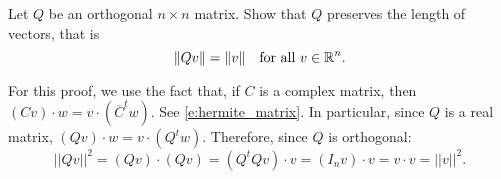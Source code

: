 \documentclass{ximera}
\begin{document}
\begin{exercise} \label{c7.9.2}
Let $Q$ be an orthogonal $n\times n$ matrix.
Show that $Q$ preserves the length of vectors, that is
\[
\|Qv\| = \|v\|\quad \mbox{for all $v\in\mbox{$\Bbb{R}$}^n$.}
\]

\begin{solution}

\soln For this proof, we use the fact that, if $C$ is a complex matrix, then
$(Cv) \cdot w = v \cdot (\overline{C}^tw)$.  See \eqref{e:hermite_matrix}.
In particular, since $Q$ is a real matrix, $(Qv) \cdot w = v \cdot (Q^tw)$.  
Therefore, since $Q$ is orthogonal:
\[
||Qv||^2 = (Qv) \cdot (Qv) = (Q^tQv) \cdot v = (I_nv) \cdot v
= v \cdot v = ||v||^2.
\]


\end{solution}
\end{exercise}
\end{document}
